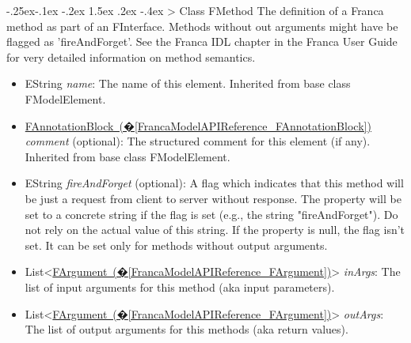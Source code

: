 \documentclass[a4paper,10pt]{scrreprt}
\makeatletter
\renewcommand\subsection{\medskip\@startsection{subsection}{2}{\z@}%
  {-.25ex\@plus -.1ex \@minus -.2ex}%
  {1.5ex \@plus .2ex \@minus -.4ex}%
  {\ifnum \scr@compatibility>\@nameuse{scr@v@2.96}\relax
    \setlength{\parfillskip}{\z@ plus 1fil}\fi
    \raggedsection\normalfont\sectfont\nobreak\size@subsection
  }%
}
\newlength{\XdocItemIndent}
\makeatother
\begin{document}
\subsection{Class FMethod}
\label{FrancaModelAPIReference_FMethod}
The definition of a Franca method as part of an FInterface.
Methods without out arguments might have be flagged as
'fireAndForget'. See the Franca IDL chapter in the Franca
User Guide for very detailed information on method semantics.
\setlength{\XdocItemIndent}{\textwidth}
\begin{itemize}
\addtolength{\XdocItemIndent}{-2.5em}
\item \begin{minipage}[t]{\XdocItemIndent}
EString \textit{name}: The name of this element.
		 Inherited from base class FModelElement.

\end{minipage}
\item \begin{minipage}[t]{\XdocItemIndent}
\hyperref[FrancaModelAPIReference_FAnnotationBlock]{FAnnotationBlock~(�\ref*{FrancaModelAPIReference_FAnnotationBlock})} \textit{comment} (optional): The structured comment for this element (if any).
		 Inherited from base class FModelElement.

\end{minipage}
\item \begin{minipage}[t]{\XdocItemIndent}
EString \textit{fireAndForget} (optional): A flag which indicates that this method will be just a request from client to server without response. The property will be set to a concrete string if the flag is set (e.g., the string "fireAndForget"). Do not rely on the actual value of this string. If the property is null, the flag isn't set. It can be set only for methods without output arguments.

\end{minipage}
\item \begin{minipage}[t]{\XdocItemIndent}
List<\hyperref[FrancaModelAPIReference_FArgument]{FArgument~(�\ref*{FrancaModelAPIReference_FArgument})}> \textit{inArgs}: The list of input arguments for this method (aka input parameters).

\end{minipage}
\item \begin{minipage}[t]{\XdocItemIndent}
List<\hyperref[FrancaModelAPIReference_FArgument]{FArgument~(�\ref*{FrancaModelAPIReference_FArgument})}> \textit{outArgs}: The list of output arguments for this methods (aka return values).


\end{minipage}
\end{itemize}
\end{document}
